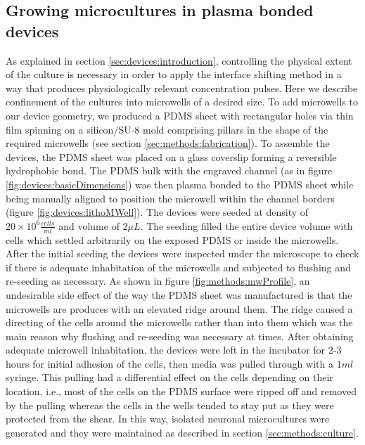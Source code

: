         \subsection{Growing microcultures in plasma bonded devices}
        \label{sec:devices:microcultures}

        As explained in section \ref{sec:devices:introduction}, controlling the physical extent of the culture is necessary in order to apply the interface shifting method in a way that produces physiologically relevant concentration pulses. Here we describe confinement of the cultures into microwells of a desired size. To add microwells to our device geometry, we produced a PDMS sheet with rectangular holes via thin film spinning on a silicon/SU-8 mold comprising pillars in the shape of the required microwells (see section \ref{sec:methods:fabrication}). To assemble the devices, the PDMS sheet was placed on a glass coverslip forming a reversible hydrophobic bond. The PDMS bulk with the engraved channel (as in figure \ref{fig:devices:basicDimensions}) was then plasma bonded to the PDMS sheet while being manually aligned to position the microwell within the channel borders (figure \ref{fig:devices:lithoMWell}). The devices were seeded at density of \(20\times10^6 \frac{cells}{ml}\) and volume of \(2 \mu L\). The seeding filled the entire device volume with cells which settled arbitrarily on the exposed PDMS or inside the microwells. After the initial seeding the devices were inspected under the microscope to check if there is adequate inhabitation of the microwells and subjected to flushing and re-seeding as necessary. As shown in figure \ref{fig:methods:mwProfile}, an undesirable side effect of the way the PDMS sheet was manufactured is that the microwells are produces with an elevated ridge around them. The ridge caused a directing of the cells around the microwells rather than into them which was the main reason why flushing and re-seeding was necessary at times. After obtaining adequate microwell inhabitation, the devices were left in the incubator for 2-3 hours for initial adhesion of the cells, then media was pulled through with a \(1 ml\) syringe. This pulling had a differential effect on the cells depending on their location, i.e., most of the cells on the PDMS surface were ripped off and removed by the pulling whereas the cells in the wells tended to stay put as they were protected from the shear. In this way, isolated neuronal microcultures were generated and they were maintained as described in section \ref{sec:methods:culture}.


